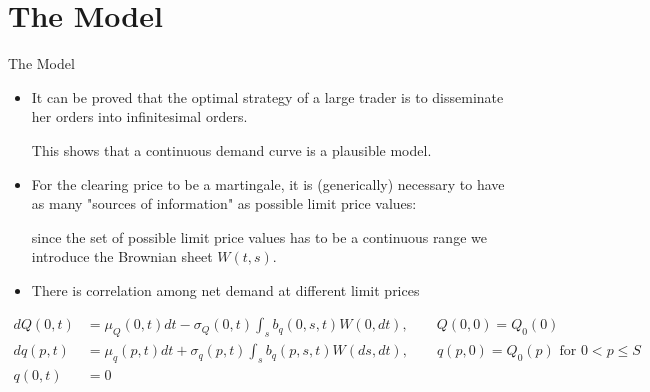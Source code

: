 \documentclass{beamer}
\begin{document}
\section{The Model}
\begin{frame}[shrink=30]{{\color{cyan}The Model}}
\bigskip
\begin{itemize}
\item It can be proved that the optimal strategy of a large trader is to disseminate her orders into infinitesimal orders.

\qquad This shows that a continuous demand curve is a plausible model.

\vspace{10pt}
\item For the clearing price to be a martingale, it is (generically) necessary to have as many "sources of information" as possible limit price values:

\qquad since the set of possible limit price values has to be a continuous range we introduce the Brownian sheet $W(t,s)$.

\vspace{10pt}
\item There is correlation among net demand at different limit prices
\end{itemize}

\vspace{-20pt}
\begin{align*}
dQ(0,t) &=\mu _{Q}(0,t)dt-\sigma _{Q}(0,t)\int_{s}b_{q}(0,s,t)W(0,dt), \qquad Q(0,0)=Q_{0}(0) \\
dq(p,t) &=\mu _{q}(p,t)dt+\sigma _{q}(p,t)\int_{s}b_{q}(p,s,t)W(ds,dt), \qquad q(p,0)=Q_{0}(p)\text{ \ for }0<p\leq S \\
q(0,t) &=0
\end{align*}

\end{frame}

\end{document}
